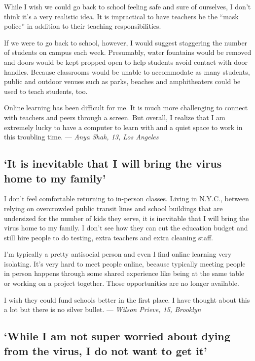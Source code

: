 While I wish we could go back to school feeling safe and sure of
ourselves, I don't think it's a very realistic idea. It is impractical
to have teachers be the ``mask police'' in addition to their teaching
responsibilities.

If we were to go back to school, however, I would suggest staggering the
number of students on campus each week. Presumably, water fountains
would be removed and doors would be kept propped open to help students
avoid contact with door handles. Because classrooms would be unable to
accommodate as many students, public and outdoor venues such as parks,
beaches and amphitheaters could be used to teach students, too.

Online learning has been difficult for me. It is much more challenging
to connect with teachers and peers through a screen. But overall, I
realize that I am extremely lucky to have a computer to learn with and a
quiet space to work in this troubling time. --- \emph{Anya Shah, 13, Los
Angeles}

\hypertarget{it-is-inevitable-that-i-will-bring-the-virus-home-to-my-family}{%
\subsection{`It is inevitable that I will bring the virus home to my
family'}\label{it-is-inevitable-that-i-will-bring-the-virus-home-to-my-family}}

I don't feel comfortable returning to in-person classes. Living in
N.Y.C., between relying on overcrowded public transit lines and school
buildings that are undersized for the number of kids they serve, it is
inevitable that I will bring the virus home to my family. I don't see
how they can cut the education budget and still hire people to do
testing, extra teachers and extra cleaning staff.

I'm typically a pretty antisocial person and even I find online learning
very isolating. It's very hard to meet people online, because typically
meeting people in person happens through some shared experience like
being at the same table or working on a project together. Those
opportunities are no longer available.

I wish they could fund schools better in the first place. I have thought
about this a lot but there is no silver bullet. --- \emph{Wilson Prieve,
15, Brooklyn}

\hypertarget{while-i-am-not-super-worried-about-dying-from-the-virus-i-do-not-want-to-get-it}{%
\subsection{`While I am not super worried about dying from the virus, I
do not want to get
it'}\label{while-i-am-not-super-worried-about-dying-from-the-virus-i-do-not-want-to-get-it}}

